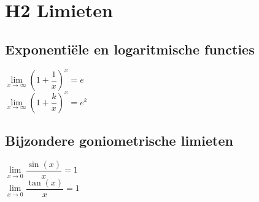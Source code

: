 \section{H2 Limieten}

\subsection{Exponentiële en logaritmische functies}
$\lim\limits_{x\rightarrow \infty}\left(1+\dfrac{1}{x}\right)^x=e$\\
$\lim\limits_{x\rightarrow \infty}\left(1+\dfrac{k}{x}\right)^x=e^k$

\subsection{Bijzondere goniometrische limieten}
$\lim\limits_{x\rightarrow0}\dfrac{\sin (x)}{x} = 1$\\
$\lim\limits_{x\rightarrow 0}\dfrac{\tan (x)}{x}=1$